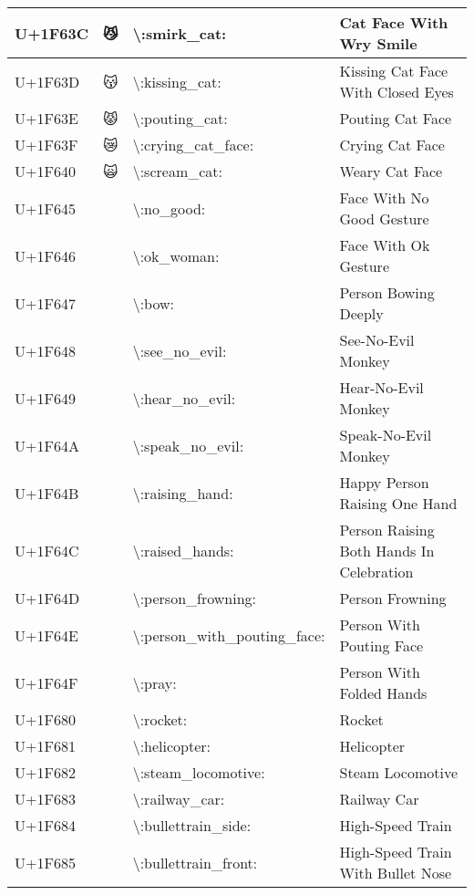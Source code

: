 \begin{table}[h]
\begin{tabulary}{\linewidth}{|L|L|L|L|}
\hline
U+1F63C & 😼 & {\textbackslash}:smirk\_cat: & Cat Face With Wry Smile \\
\hline
U+1F63D & 😽 & {\textbackslash}:kissing\_cat: & Kissing Cat Face With Closed Eyes \\
\hline
U+1F63E & 😾 & {\textbackslash}:pouting\_cat: & Pouting Cat Face \\
\hline
U+1F63F & 😿 & {\textbackslash}:crying\_cat\_face: & Crying Cat Face \\
\hline
U+1F640 & 🙀 & {\textbackslash}:scream\_cat: & Weary Cat Face \\
\hline
U+1F645 & 🙅 & {\textbackslash}:no\_good: & Face With No Good Gesture \\
\hline
U+1F646 & 🙆 & {\textbackslash}:ok\_woman: & Face With Ok Gesture \\
\hline
U+1F647 & 🙇 & {\textbackslash}:bow: & Person Bowing Deeply \\
\hline
U+1F648 & 🙈 & {\textbackslash}:see\_no\_evil: & See-No-Evil Monkey \\
\hline
U+1F649 & 🙉 & {\textbackslash}:hear\_no\_evil: & Hear-No-Evil Monkey \\
\hline
U+1F64A & 🙊 & {\textbackslash}:speak\_no\_evil: & Speak-No-Evil Monkey \\
\hline
U+1F64B & 🙋 & {\textbackslash}:raising\_hand: & Happy Person Raising One Hand \\
\hline
U+1F64C & 🙌 & {\textbackslash}:raised\_hands: & Person Raising Both Hands In Celebration \\
\hline
U+1F64D & 🙍 & {\textbackslash}:person\_frowning: & Person Frowning \\
\hline
U+1F64E & 🙎 & {\textbackslash}:person\_with\_pouting\_face: & Person With Pouting Face \\
\hline
U+1F64F & 🙏 & {\textbackslash}:pray: & Person With Folded Hands \\
\hline
U+1F680 & 🚀 & {\textbackslash}:rocket: & Rocket \\
\hline
U+1F681 & 🚁 & {\textbackslash}:helicopter: & Helicopter \\
\hline
U+1F682 & 🚂 & {\textbackslash}:steam\_locomotive: & Steam Locomotive \\
\hline
U+1F683 & 🚃 & {\textbackslash}:railway\_car: & Railway Car \\
\hline
U+1F684 & 🚄 & {\textbackslash}:bullettrain\_side: & High-Speed Train \\
\hline
U+1F685 & 🚅 & {\textbackslash}:bullettrain\_front: & High-Speed Train With Bullet Nose \\

\end{tabulary}
\end{table}
